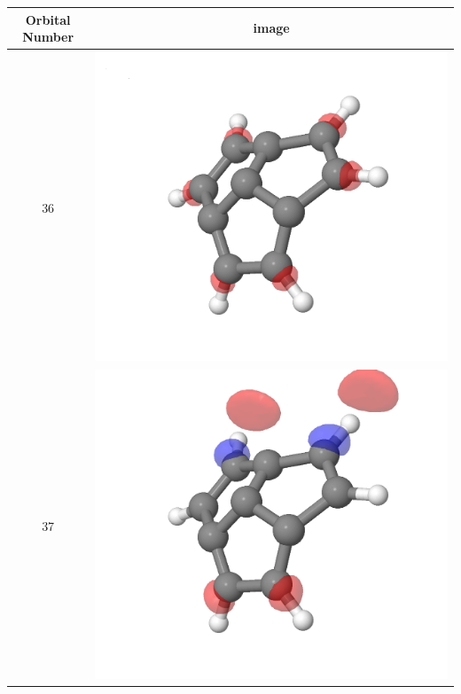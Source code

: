 \documentclass{article}
\begin{document}
\begin{tabular}{|c|c|}
\hline Orbital Number& image\\\hline
36 & \includegraphics[scale=0.3]{M1S_36.png}\\ \hline
37 & \includegraphics[scale=0.3]{M1S_37.png}\\ \hline

\end{tabular}
\end{document}
